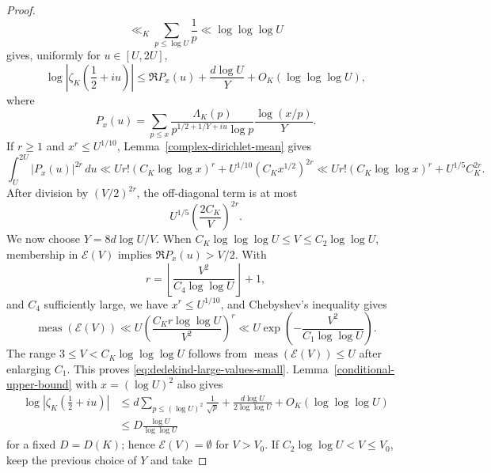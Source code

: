 \documentclass[10pt,a4paper]{amsart}
\renewcommand{\ge}{\geqslant}
\renewcommand{\le}{\leqslant}
\begin{document}
\begin{proof}
\begin{equation*}
        \ll_K \sum_{p\le\log U}\frac1p
        \ll\log\log\log U
\end{equation*}
gives, uniformly for $u\in[U,2U]$,
\begin{equation}\label{eq:sound-prime-majorant}
        \log\left|\zeta_K\left(\frac12+iu\right)\right|
        \le
        \Re P_x(u)+\frac{d\log U}{Y}+O_K(\log\log\log U),
\end{equation}
where
\begin{equation*}
        P_x(u)=
        \sum_{p\le  x}
        \frac{\Lambda_K(p)}{p^{1/2+1/Y+iu}\log p}
        \frac{\log(x/p)}{Y}.
\end{equation*}
If $r\ge1$ and $x^r\le U^{1/10}$, Lemma~\ref{complex-dirichlet-mean} gives
\begin{equation}\label{eq:Px-moment}
        \int_U^{2U}|P_x(u)|^{2r}\,du
        \ll
        U r!\left(C_K\log\log x\right)^r
        +U^{1/10}(C_Kx^{1/2})^{2r}
        \ll
        U r!\left(C_K\log\log x\right)^r+U^{1/5}C_K^{2r}.
\end{equation}
After division by $(V/2)^{2r}$, the off-diagonal term is at most
\begin{equation*}
        U^{1/5}\left(\frac{2C_K}{V}\right)^{2r}.
\end{equation*}
We now choose $Y=8d\log U/V$.  When $C_K\log\log\log U\le V\le C_2\log\log U$, membership in $\mathcal E(V)$ implies $\Re P_x(u)>V/2$.  With
\begin{equation*}
        r=\left\lfloor\frac{V^2}{C_4\log\log U}\right\rfloor+1,
\end{equation*}
and $C_4$ sufficiently large, we have $x^r\le U^{1/10}$, and Chebyshev's inequality gives
\begin{equation*}
        \operatorname{meas}(\mathcal E(V))
        \ll
        U\left(\frac{C_Kr\log\log U}{V^2}\right)^r
        \ll
        U\exp\left(-\frac{V^2}{C_1\log\log U}\right).
\end{equation*}
The range $3\le V<C_K\log\log\log U$ follows from $\operatorname{meas}(\mathcal E(V))\le U$ after enlarging $C_1$.  This proves \eqref{eq:dedekind-large-values-small}.  Lemma~\ref{conditional-upper-bound} with $x=(\log U)^2$ also gives
\begin{align*}
\log\left|\zeta_K\left(\frac12+iu\right)\right|
&\le d\sum_{p\le(\log U)^2}\frac1{\sqrt p}
+\frac{d\log U}{2\log\log U}+O_K(\log\log\log U)\\
&\le D\frac{\log U}{\log\log U}
\end{align*}
for a fixed $D=D(K)$; hence $\mathcal E(V)=\emptyset$ for $V>V_0$.  If $C_2\log\log U<V\le V_0$, keep the previous choice of $Y$ and take

\end{proof}
\end{document}
